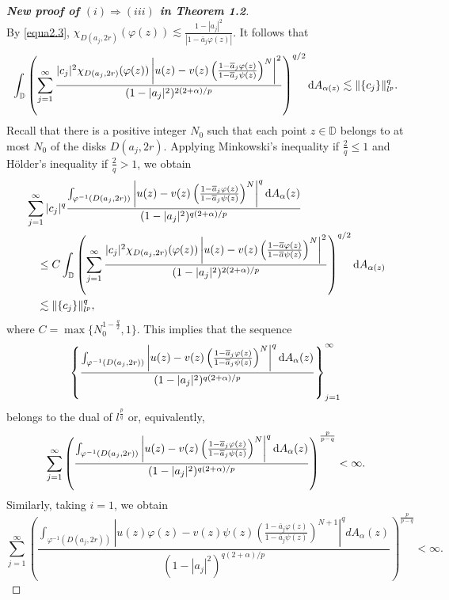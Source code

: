 \documentclass[preprint,12pt,times]{elsarticle}
\theoremstyle{definition}
\theoremstyle{remark}
\numberwithin{equation}{section}
\begin{document}
\begin{proof}[{\bf New proof of $(i)\Rightarrow (iii)$ in Theorem 1.2}]
\begin{equation*}
\end{equation*}
By \eqref{equa2.3}, $\chi_{D(a_j,2r)}(\varphi(z))\lesssim \frac{1-|a_j|^2}{|1-\overline{a}_j\varphi(z)|}$. It follows that
\begin{equation*}
\begin{split}
\int_{\mathbb{D}}\left(\sum_{j=1}^{\infty}\frac{|c_j|^2\chi_{D(a_j,2r)}(\varphi(z))\left|u(z)-v(z)\left(\frac{1-\overline{a}_j\varphi(z)}{1-\overline{a}_j\psi(z)}\right)^N\right|^2}{(1-|a_j|^2)^{2(2+\alpha)/p}}\right)^{q/2}{\rm d}A_{\alpha(z)} \lesssim \|\{c_j\}\|_{l^p}^q.
\end{split}
\end{equation*}
Recall that there is a positive integer $N_0$ such that each point $z\in\mathbb{D}$ belongs to at most $N_0$ of the disks $D(a_j,2r)$. Applying Minkowski's inequality if $\frac{2}{q}\leq 1$ and H\"older's inequality if $\frac{2}{q}>1$, we obtain
\begin{equation*}
\begin{split}
&\sum_{j=1}^{\infty}|c_j|^q\frac{\int_{\varphi^{-1}(D(a_j,2r))}\left|u(z)-v(z)\left(\frac{1-\overline{a}_j\varphi(z)}{1-\overline{a}_j\psi(z)}\right)^N\right|^q{\rm d}A_{\alpha}(z)}{(1-|a_j|^2)^{q(2+\alpha)/p}}\\
&\quad\leq C\int_{\mathbb{D}}\left(\sum_{j=1}^{\infty}\frac{|c_j|^2\chi_{D(a_j,2r)}(\varphi(z))\left|u(z)-v(z)\left(\frac{1-\overline{a}\varphi(z)}{1-\overline{a}\psi(z)}\right)^N\right|^2}{(1-|a_j|^2)^{2(2+\alpha)/p}}\right)^{q/2}{\rm d}A_{\alpha(z)}\\
&\quad \lesssim \|\{c_j\}\|_{l^p}^q,
\end{split}
\end{equation*}
where $C=\max\{N_0^{1-\frac{q}{2}},1\}$. This implies that the sequence 
\[\left\{\frac{\int_{\varphi^{-1}(D(a_j,2r))}\left|u(z)-v(z)\left(\frac{1-\overline{a}_j\varphi(z)}{1-\overline{a}_j\psi(z)}\right)^N\right|^q{\rm d}A_{\alpha}(z)}{(1-|a_j|^2)^{q(2+\alpha)/p}}\right\}_{j=1}^{\infty}\]
belongs to the dual of $l^{\frac{p}{q}}$ or, equivalently,
\begin{equation}\label{equa3.7}
\sum_{j=1}^{\infty}\left(\frac{\int_{\varphi^{-1}(D(a_j,2r))}\left|u(z)-v(z)\left(\frac{1-\overline{a}_j\varphi(z)}{1-\overline{a}_j\psi(z)}\right)^N\right|^q{\rm d}A_{\alpha}(z)}{(1-|a_j|^2)^{q(2+\alpha)/p}}\right)^{\frac{p}{p-q}}<\infty.
\end{equation}
Similarly, taking $i=1$, we obtain
\begin{equation}\label{equa3.8}
\sum_{j=1}^{\infty}\left(\frac{\int_{\varphi^{-1}(D(a_j,2r))}\left|u(z)\varphi(z)-v(z)\psi(z)\left(\frac{1-\overline{a}_j\varphi(z)}{1-\overline{a}_j\psi(z)}\right)^{N+1}\right|^qdA_{\alpha}(z)}{(1-|a_j|^2)^{q(2+\alpha)/p}}\right)^{\frac{p}{p-q}}<\infty.

\end{equation}
\end{proof}
\end{document}
